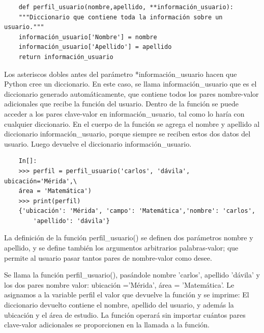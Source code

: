 \hspace{-2.3cm}{\ttfamily \scriptsize perfil.py}  \vspace{-0.5cm}
\begin{lstlisting}
	def perfil_usuario(nombre,apellido, **información_usuario):
	"""Diccionario que contiene toda la información sobre un usuario."""
	información_usuario['Nombre'] = nombre
	información_usuario['Apellido'] = apellido
	return información_usuario
\end{lstlisting}
Los asteriscos dobles antes del parámetro {\ttfamily **información\_usuario} hacen que Python cree un diccionario. En este caso, se llama {\ttfamily información\_usuario} que es el diccionario generado automáticamente, que contiene todos los 
pares nombre-valor adicionales que recibe la función del usuario. Dentro de la función se puede acceder a los pares clave-valor en {\ttfamily información\_usuario},  tal como lo haría con cualquier diccionario. En el cuerpo de la función se agrega el nombre y apellido al diccionario  {\ttfamily información\_usuario}, porque siempre se reciben estos dos datos del usuario. Luego devuelve el diccionario  {\ttfamily información\_usuario}.
\begin{lstlisting}
	In[]:
	>>> perfil = perfil_usuario('carlos', 'dávila', ubicación='Mérida',\
	área = 'Matemática')
	>>> print(perfil)			
	{'ubicación': 'Mérida', 'campo': 'Matemática','nombre': 'carlos',
		'apellido': 'dávila'}	
\end{lstlisting}
La definición de la función {\ttfamily perfil\_usuario()} se definen dos parámetros nombre y apellido, y se define también los argumentos arbitrarios palabras-valor; que permite al usuario pasar tantos pares de nombre-valor como desee.

Se llama la función {\ttfamily perfil\_usuario()}, pasándole  nombre 'carlos', apellido 'dávila' y los dos pares nombre valor: ubicación ='Mérida', área = 'Matemática'. %
Le asignamos a la variable {\ttfamily perfil} el valor que devuelve la función y se imprime:
El diccionario devuelto contiene el nombre, apellido del usuario, y además la ubicación y el área de estudio. La función operará sin importar cuántos pares clave-valor adicionales se proporcionen en la llamada a la función.


